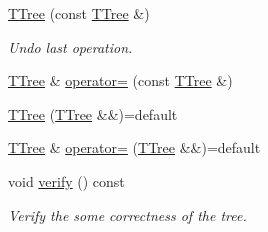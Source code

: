 \begin{DoxyCompactItemize}
\hyperlink{classTTree_ae9c011ce08c03b531ea5b31201be7609}{T\+Tree} (const \hyperlink{classTTree}{T\+Tree} \&)
\begin{DoxyCompactList}\small\item\em Undo last operation. \end{DoxyCompactList}\item 
\hyperlink{classTTree}{T\+Tree} \& \hyperlink{classTTree_a4367965d303770e89b9b10dc9462c0f3}{operator=} (const \hyperlink{classTTree}{T\+Tree} \&)
\item 
\hyperlink{classTTree_acfa1c1f035255298fd22be8810d5d672}{T\+Tree} (\hyperlink{classTTree}{T\+Tree} \&\&)=default
\item 
\hyperlink{classTTree}{T\+Tree} \& \hyperlink{classTTree_a8751a54d1c80d2f822d84a98e5c96293}{operator=} (\hyperlink{classTTree}{T\+Tree} \&\&)=default
\item 
void \hyperlink{classTTree_a561ca642fa6104a2275c30974b57e221}{verify} () const 
\begin{DoxyCompactList}\small\item\em Verify the some correctness of the tree. \end{DoxyCompactList}\end{DoxyCompactItemize}
